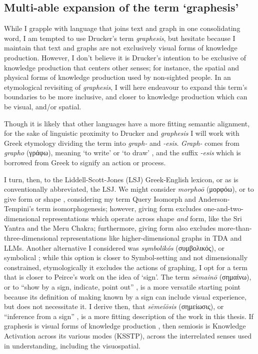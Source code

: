 \subsection{Multi-able expansion of the term `graphesis’}
While I grapple with language that joins text and graph in one consolidating word, I am tempted to use Drucker’s term \textit{graphesis}, but hesitate because I maintain that text and graphs are not exclusively visual forms of knowledge production. However, I don’t believe it is Drucker’s intention to be exclusive of knowledge production that centers other senses; for instance, the spatial and physical forms of knowledge production used by non-sighted people. In an etymological revisiting of \textit{graphesis}, I will here endeavour to expand this term’s boundaries to be more inclusive, and closer to knowledge production which can be visual, and/or spatial.

Though it is likely that other languages have a more fitting semantic alignment, for the sake of linguistic proximity to Drucker and \textit{graphesis} I will work with Greek etymology dividing the term into \textit{graph-} and \textit{-esis}. \textit{Graph-} comes from \textit{grapho} (γράφω), meaning `to write' or `to draw' \citep{liddell__1996-4}, and the suffix \textit{-esis} which is borrowed from Greek to signify an action or process. 

I turn, then, to the Liddell-Scott-Jones (LSJ) Greek-English lexicon, or as is conventionally abbreviated, the LSJ. We might consider \textit{morphoō} (μορφόω), or to give form or shape \citep{liddell__1996-2}, considering my term Query Isomorph and Anderson-Tempini’s term isomorphogenesis; however, giving form excludes one-and-two-dimensional representations which operate across shape \textit{and} form, like the Sri Yantra and the Meru Chakra; furthermore, giving form also excludes more-than-three-dimensional representations like higher-dimensional graphs in TDA and LLMs. Another alternative I considered was \textit{symbolikós} (συμβολικός), or symbolical \citep{liddell__1996-3}; while this option is closer to Symbol-setting and not dimensionally constrained, etymologically it excludes the actions of graphing, I opt for a term that is closer to Peirce’s work on the idea of ‘sign’. The term \textit{sēmainō} (σημαίνω), or to ``show by a sign, indicate, point out” \citep{liddell__1996}, is a more versatile starting point because its definition of making known by a sign can include visual experience, but does not necessitate it. I derive then, that \textit{sēmeíōsis} (σημείωσις), or ``inference from a sign” \citep{liddell__1996-1}, is a more fitting description of the work in this thesis. If graphesis is visual forms of knowledge production \citep{drucker_graphesis_2014}, then semiosis is Knowledge Activation across its various modes (KSSTP), across the interrelated senses used in understanding, including the visuospatial. 

